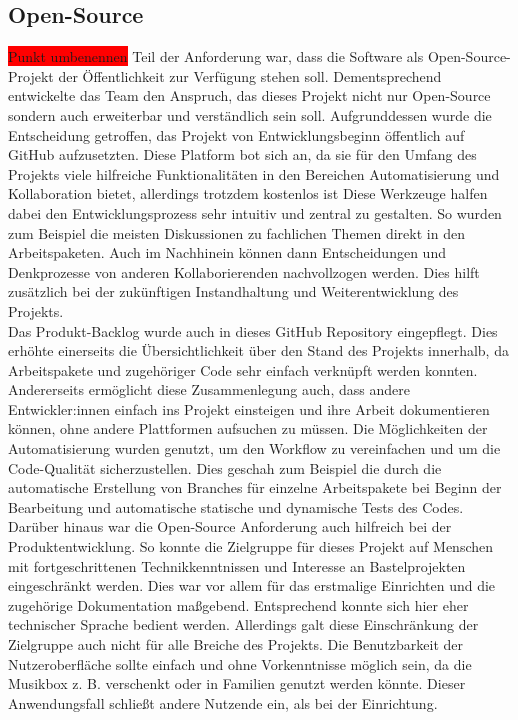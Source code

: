 \documentclass[10pt, a4paper]{article}
\begin{document}
\subsection{Open-Source}
\colorbox{red}{Punkt umbenennen}
Teil der Anforderung war, dass die Software als Open-Source-Projekt der Öffentlichkeit zur Verfügung stehen soll.
Dementsprechend entwickelte das Team den Anspruch, das dieses Projekt nicht nur Open-Source sondern auch erweiterbar und verständlich sein soll.
Aufgrunddessen wurde die Entscheidung getroffen, das Projekt von Entwicklungsbeginn öffentlich auf GitHub aufzusetzten.
Diese Platform bot sich an, da sie für den Umfang des Projekts viele hilfreiche Funktionalitäten in den Bereichen Automatisierung und Kollaboration bietet, allerdings trotzdem kostenlos ist
Diese Werkzeuge halfen dabei den Entwicklungsprozess sehr intuitiv und zentral zu gestalten.
So wurden zum Beispiel die meisten Diskussionen zu fachlichen Themen direkt in den Arbeitspaketen.
Auch im Nachhinein können dann Entscheidungen und Denkprozesse von anderen Kollaborierenden nachvollzogen werden.
Dies hilft zusätzlich bei der zukünftigen Instandhaltung und Weiterentwicklung des Projekts.
\\
Das Produkt-Backlog wurde auch in dieses GitHub Repository eingepflegt.
Dies erhöhte einerseits die Übersichtlichkeit über den Stand des Projekts innerhalb, da Arbeitspakete und zugehöriger Code sehr einfach verknüpft werden konnten.
Andererseits ermöglicht diese Zusammenlegung auch, dass andere Entwickler:innen einfach ins Projekt einsteigen und ihre Arbeit dokumentieren können, ohne andere Plattformen aufsuchen zu müssen.
Die Möglichkeiten der Automatisierung wurden genutzt, um den Workflow zu vereinfachen und um die Code-Qualität sicherzustellen.
Dies geschah zum Beispiel die durch die automatische Erstellung von Branches für einzelne Arbeitspakete bei Beginn der Bearbeitung und automatische statische und dynamische Tests des Codes.
\\
Darüber hinaus war die Open-Source Anforderung auch hilfreich bei der Produktentwicklung.
So konnte die Zielgruppe für dieses Projekt auf Menschen mit fortgeschrittenen Technikkenntnissen und Interesse an Bastelprojekten eingeschränkt werden.
Dies war vor allem für das erstmalige Einrichten und die zugehörige Dokumentation maßgebend.
Entsprechend konnte sich hier eher technischer Sprache bedient werden.
Allerdings galt diese Einschränkung der Zielgruppe auch nicht für alle Breiche des Projekts.
Die Benutzbarkeit der Nutzeroberfläche sollte einfach und ohne Vorkenntnisse möglich sein, da die Musikbox z. B. verschenkt oder in Familien genutzt werden könnte.
Dieser Anwendungsfall schließt andere Nutzende ein, als bei der Einrichtung.
\end{document}
